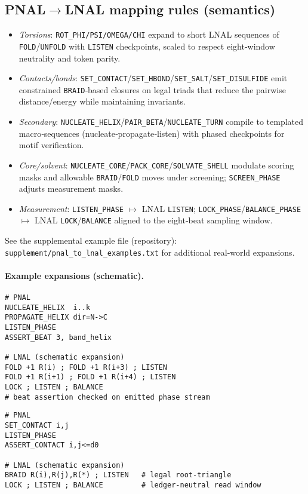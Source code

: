 \documentclass[12pt,a4paper]{article}
\begin{document}
\subsection{PNAL\texorpdfstring{$\to$}{->}LNAL mapping rules (semantics)}
\begin{itemize}
  \item \emph{Torsions}: \texttt{ROT\_PHI/PSI/OMEGA/CHI} expand to short LNAL sequences of \texttt{FOLD}/\texttt{UNFOLD} with \texttt{LISTEN} checkpoints, scaled to respect eight‑window neutrality and token parity.
  \item \emph{Contacts/bonds}: \texttt{SET\_CONTACT}/\texttt{SET\_HBOND}/\texttt{SET\_SALT}/\texttt{SET\_DISULFIDE} emit constrained \texttt{BRAID}‑based closures on legal triads that reduce the pairwise distance/energy while maintaining invariants.
  \item \emph{Secondary}: \texttt{NUCLEATE\_HELIX}/\texttt{PAIR\_BETA}/\texttt{NUCLEATE\_TURN} compile to templated macro‑sequences (nucleate‑propagate‑listen) with phased checkpoints for motif verification.
  \item \emph{Core/solvent}: \texttt{NUCLEATE\_CORE}/\texttt{PACK\_CORE}/\texttt{SOLVATE\_SHELL} modulate scoring masks and allowable \texttt{BRAID}/\texttt{FOLD} moves under screening; \texttt{SCREEN\_PHASE} adjusts measurement masks.
  \item \emph{Measurement}: \texttt{LISTEN\_PHASE} $\mapsto$ LNAL \texttt{LISTEN}; \texttt{LOCK\_PHASE}/\texttt{BALANCE\_PHASE} $\mapsto$ LNAL \texttt{LOCK}/\texttt{BALANCE} aligned to the eight‑beat sampling window.
\end{itemize}
\noindent See the supplemental example file (repository): \texttt{supplement/pnal\_to\_lnal\_examples.txt} for additional real‑world expansions.

\paragraph{Example expansions (schematic).}
\begin{verbatim}
# PNAL
NUCLEATE_HELIX  i..k
PROPAGATE_HELIX dir=N->C
LISTEN_PHASE
ASSERT_BEAT 3, band_helix

# LNAL (schematic expansion)
FOLD +1 R(i) ; FOLD +1 R(i+3) ; LISTEN
FOLD +1 R(i+1) ; FOLD +1 R(i+4) ; LISTEN
LOCK ; LISTEN ; BALANCE
# beat assertion checked on emitted phase stream
\end{verbatim}

\begin{verbatim}
# PNAL
SET_CONTACT i,j
LISTEN_PHASE
ASSERT_CONTACT i,j<=d0

# LNAL (schematic expansion)
BRAID R(i),R(j),R(*) ; LISTEN   # legal root-triangle
LOCK ; LISTEN ; BALANCE         # ledger-neutral read window
\end{verbatim}
\end{document}
